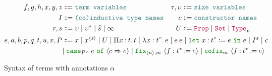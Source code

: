 \begin{figure}
\centering
\begin{align*}
f, g, h, x, y, z &\Coloneqq \meta{term variables} &
\tau, \upsilon &\Coloneqq \meta{size variables} \\
I &\Coloneqq \meta{(co)inductive type names} &
c &\Coloneqq \meta{constructor names} \\
r, s &\Coloneqq \upsilon \mid \upsilon^* \mid \succ{s} \mid \infty &
U &\Coloneqq \Prop \mid \Set \mid \Type{n} \\
e, a, b, p, q, t, u, v, P &\Coloneqq \mathrlap{x \mid x^{\seq{s}} \mid U \mid \prod{x}{t}{t} \mid \abs{x}{t^\circ}{e} \mid \app{e}{e} \mid \letin{x}{t^\circ}{e}{e} \mid I^s \mid c} \\
&\mathrlap{\mid \caseof{P^\circ}{e}{c}{e} \mid \fix{\seq{n}, m}{f}{t^*}{e} \mid \cofix{m}{f}{t^*}{e}}
\end{align*}
\caption{Syntax of \lang terms with annotations $\alpha$}
\label{fig:terms-general}
\end{figure}

